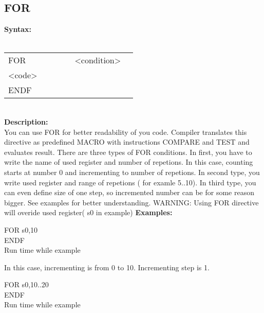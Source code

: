                 \subsection{FOR}
                    \textbf{Syntax:}\\
                    \\ {
                        \texttt{}
                            \begin{tabular}[h!]{llll}
                                { \color{highlight_directive} FOR } & \verb'     ' &
                                { \color{highlight_constant} <condition> }\\
                                { \color{highlight_symbol} <code> }\\
                                { \color{highlight_directive} ENDF }
                            \end{tabular}
                        }\\
                    \textbf{Description:}\\
                    You can use FOR for better readability of you code. Compiler translates this directive as predefined MACRO with instructions COMPARE and TEST and
                    evaluates result. There are three types of FOR conditions. In first, you have to write the name of used register and number of repetions. In this case,
                    counting starts at number 0 and incrementing to number of repetions. In second type, you write used register and range of
                    repetions ( for examle 5..10). In third type, you can even define size of one step, so incremented number can be for some reason bigger.
                    See examples for better understanding. WARNING: Using FOR directive will overide used register( s0 in example)
                    \textbf{Examples:}\\
                            \begin{code}[h!]
                                    { \color{highlight_directive} FOR  }
                                    { \color{highlight_constant}   s0,10 }\\
                                    { \color{highlight_directive}  ENDF}\\
                                \caption{Run time while example}
                            \end{code}
                    In this case, incrementing is from 0 to 10. Incrementing step is 1.
                            \begin{code}[h!]
                                    { \color{highlight_directive} FOR  }
                                    { \color{highlight_constant}   s0,10..20 }\\
                                    { \color{highlight_directive}  ENDF}\\
                                \caption{Run time while example}
                            \end{code}
